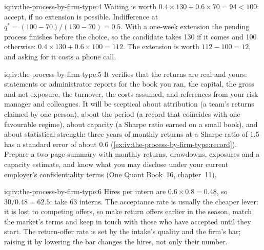 \begin{solution}{iq:iv:the-process-by-firm-type:4}
Waiting is worth $0.4 \times 130 + 0.6 \times 70 = 94 < 100$: accept, if no extension is possible.
Indifference at $q^\ast = (100 - 70)/(130 - 70) = 0.5$. With a one-week extension the pending process
finishes before the choice, so the candidate takes 130 if it comes and 100 otherwise: $0.4 \times 130 + 0.6
\times 100 = 112$. The extension is worth $112 - 100 = 12$, and asking for it costs a phone call.
\end{solution}

\begin{solution}{iq:iv:the-process-by-firm-type:5}
It verifies that the returns are real and yours: statements or administrator reports for the book you ran,
the capital, the gross and net exposure, the turnover, the costs assumed, and references from your risk
manager and colleagues. It will be sceptical about attribution (a team's returns claimed by one person),
about the period (a record that coincides with one favourable regime), about capacity (a Sharpe ratio earned
on a small book), and about statistical strength: three years of monthly returns at a Sharpe ratio of 1.5 has
a standard error of about 0.6 (\cref{ex:iv:the-process-by-firm-type:record}). Prepare a two-page summary with
monthly returns, drawdowns, exposures and a capacity estimate, and know what you may disclose under your
current employer's confidentiality terms (One Quant Book~16, chapter~11).
\end{solution}

\begin{solution}{iq:iv:the-process-by-firm-type:6}
Hires per intern are $0.6 \times 0.8 = 0.48$, so $30/0.48 = 62.5$: take 63 interns. The acceptance rate is
usually the cheaper lever: it is lost to competing offers, so make return offers earlier in the season,
match the market's terms and keep in touch with those who have accepted until they start. The return-offer
rate is set by the intake's quality and the firm's bar; raising it by lowering the bar changes the hires,
not only their number.
\end{solution}

